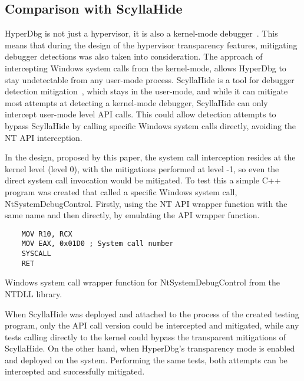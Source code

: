 \subsection{Comparison with ScyllaHide}
HyperDbg is not just a hypervisor, it is also a kernel-mode debugger~\cite{karvandi2022hyperdbg}. This means that during the design of 
the hypervisor transparency features, mitigating debugger detections was also taken into consideration. The approach of intercepting Windows system calls 
from the kernel-mode, allows HyperDbg to stay undetectable from any user-mode process. ScyllaHide is a tool for debugger detection mitigation~\cite{scyllahide}, 
which stays in the user-mode, and while it can mitigate most attempts at detecting a kernel-mode debugger, ScyllaHide can only intercept user-mode level API calls. 
This could allow detection attempts to bypass ScyllaHide by calling specific Windows system calls directly, avoiding the NT API interception. 

In the design, proposed by this paper, the system call interception resides at the kernel level (level 0), with the mitigations performed at level -1, 
so even the direct system call invocation would be mitigated. To test this a simple C++ program was created that called a specific Windows system call, 
NtSystemDebugControl. Firstly, using the NT API wrapper function with the same name and then directly, by emulating the API wrapper function.
\begin{listing}[!ht]

\begin{verbatim}
    MOV R10, RCX
    MOV EAX, 0x01D0 ; System call number
    SYSCALL
    RET
\end{verbatim}
\caption{Windows system call wrapper function for NtSystemDebugControl from the NTDLL library.}
\label{lst:syscall-wrapper}
\end{listing}
When ScyllaHide was deployed and attached to the process of the created testing program, only the API call version could be intercepted and mitigated, 
while any tests calling directly to the kernel could bypass the transparent mitigations of ScyllaHide.
On the other hand, when HyperDbg's transparency mode is enabled and deployed on the system. Performing the same tests, both attempts can be intercepted and 
successfully mitigated.



